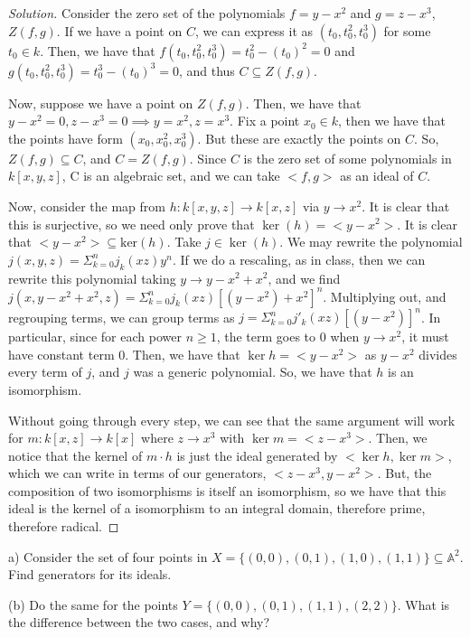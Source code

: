 \documentclass[10pt]{article}
\newenvironment{problem}[2][Problem]{\begin{trivlist}
\item[\hskip \labelsep {\bfseries #1}\hskip \labelsep {\bfseries #2.}]}{\end{trivlist}}
\begin{document}
\begin{proof}[Solution]

Consider the zero set of the polynomials $f = y- x^2$ and $g = z - x^3$, $Z(f,g)$. If we have a point on $C$, we can express it as $(t_0, t_0^2, t_0^3)$ for some $t_0 \in k$. Then, we have that $f(t_0,t_0^2,t_0^3) = t_0^2 - (t_0)^2 = 0$ and $g(t_0,t_0^2,t_0^3) = t_0^3- (t_0)^3 = 0$, and thus $C \subseteq Z(f,g)$.

Now, suppose we have a point on $Z(f,g)$. Then, we have that $y - x^2 = 0, z - x^3 = 0 \implies y = x^2, z = x^3$. Fix a point $x_0 \in k$, then we have that the points have form $(x_0,x_0^2,x_0^3)$. But these are exactly the points on $C$. So, $Z(f,g) \subseteq C$, and $C = Z(f,g)$. Since $C$ is the zero set of some polynomials in $k[x,y,z]$, C is an algebraic set, and we can take $<f,g>$ as an ideal of $C$. 

Now, consider the map from $h: k[x,y,z] \to  k[x,z]$ via $y \to x^2$. It is clear that this is surjective, so we need only prove that $\ker(h) = <y-x^2>$. It is clear that $<y - x^2> \subseteq \text{ker}(h)$. Take $j \in \ker(h)$. We may rewrite the polynomial $j(x,y,z) = \Sigma_{k=0}^n j_k(xz) y^n$. If we do a rescaling, as in class, then we can rewrite this polynomial taking $y \to y-x^2 + x^2$, and we find $j(x, y-x^2 + x^2,z) = \Sigma_{k=0}^n j_k(xz) [ (y-x^2) + x^2]^n$. Multiplying out, and regrouping terms, we can group terms as $j = \Sigma_{k=0}^n j'_k(xz) [ (y-x^2)]^n$. In particular, since for each power $n \geq 1$, the term goes to $0$ when $y \to x^2$, it must have constant term $0$. Then, we have that $\ker{h} = <y-x^2>$ as $y - x^2$ divides every term of $j$, and $j$ was a generic polynomial. So, we have that $h$ is an isomorphism.

Without going through every step, we can see that the same argument will work for $m: k[x,z] \to k[x]$ where $z \to x^3$ with $\ker{m} = <z - x^3>$. Then, we notice that the kernel of $m \cdot h$ is just the ideal generated by $<\ker{h},\ker{m}>$, which we can write in terms of our generators, $< z - x^3, y-x^2>$. But, the composition of two isomorphisms is itself an isomorphism, so we have that this ideal is the kernel of a isomorphism to an integral domain, therefore prime, therefore radical.
\end{proof}

\begin{problem}{2.3}

(a) Consider the set of four points in $X = \{(0,0),(0,1),(1,0),(1,1)\} \subseteq \mathbb{A}^2$. Find generators for its ideals.

(b) Do the same for the points $Y = \{(0,0),(0,1),(1,1),(2,2)\}$. What is the difference between the two cases, and why?

\end{problem}
\end{document}
